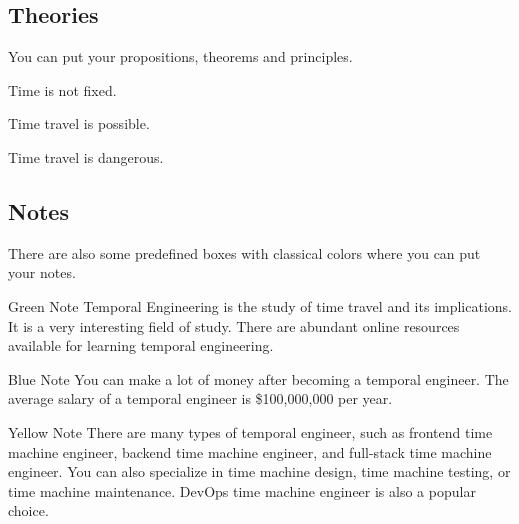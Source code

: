 \subsection{Theories}
You can put your propositions, theorems and principles.
\begin{proposition}
    Time is not fixed.
\end{proposition}

\begin{theorem}
    Time travel is possible.
\end{theorem}

\begin{principle}
    Time travel is dangerous.
\end{principle}

\subsection{Notes}
There are also some predefined boxes with classical colors where you can put your notes. 
\begin{greenbox}{Green Note}
    Temporal Engineering is the study of time travel and its implications. It is a very interesting field of study. There are abundant online resources available for learning temporal engineering.
\end{greenbox}

\begin{bluebox}{Blue Note}
    You can make a lot of money after becoming a temporal engineer. The average salary of a temporal engineer is \$100,000,000 per year.
\end{bluebox}

\begin{yellowbox}{Yellow Note}
    There are many types of temporal engineer, such as frontend time machine engineer, backend time machine engineer, and full-stack time machine engineer. You can also specialize in time machine design, time machine testing, or time machine maintenance. DevOps time machine engineer is also a popular choice.
\end{yellowbox}

